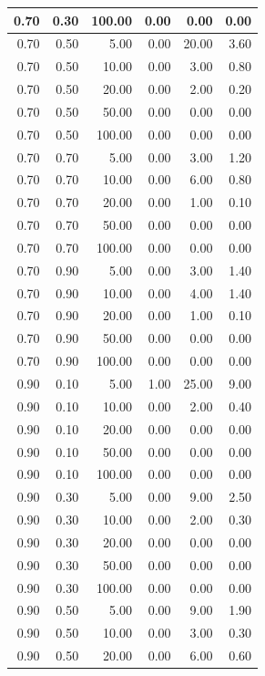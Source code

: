 \documentclass{bmstu}
\begin{document}
\begin{longtable}{|r|r|r|r|r|r|}
0.70 & 0.30 & 100.00 & 0.00 & 0.00 & 0.00 \\ \hline
0.70 & 0.50 & 5.00 & 0.00 & 20.00 & 3.60 \\ \hline
0.70 & 0.50 & 10.00 & 0.00 & 3.00 & 0.80 \\ \hline
0.70 & 0.50 & 20.00 & 0.00 & 2.00 & 0.20 \\ \hline
0.70 & 0.50 & 50.00 & 0.00 & 0.00 & 0.00 \\ \hline
0.70 & 0.50 & 100.00 & 0.00 & 0.00 & 0.00 \\ \hline
0.70 & 0.70 & 5.00 & 0.00 & 3.00 & 1.20 \\ \hline
0.70 & 0.70 & 10.00 & 0.00 & 6.00 & 0.80 \\ \hline
0.70 & 0.70 & 20.00 & 0.00 & 1.00 & 0.10 \\ \hline
0.70 & 0.70 & 50.00 & 0.00 & 0.00 & 0.00 \\ \hline
0.70 & 0.70 & 100.00 & 0.00 & 0.00 & 0.00 \\ \hline
0.70 & 0.90 & 5.00 & 0.00 & 3.00 & 1.40 \\ \hline
0.70 & 0.90 & 10.00 & 0.00 & 4.00 & 1.40 \\ \hline
0.70 & 0.90 & 20.00 & 0.00 & 1.00 & 0.10 \\ \hline
0.70 & 0.90 & 50.00 & 0.00 & 0.00 & 0.00 \\ \hline
0.70 & 0.90 & 100.00 & 0.00 & 0.00 & 0.00 \\ \hline
0.90 & 0.10 & 5.00 & 1.00 & 25.00 & 9.00 \\ \hline
0.90 & 0.10 & 10.00 & 0.00 & 2.00 & 0.40 \\ \hline
0.90 & 0.10 & 20.00 & 0.00 & 0.00 & 0.00 \\ \hline
0.90 & 0.10 & 50.00 & 0.00 & 0.00 & 0.00 \\ \hline
0.90 & 0.10 & 100.00 & 0.00 & 0.00 & 0.00 \\ \hline
0.90 & 0.30 & 5.00 & 0.00 & 9.00 & 2.50 \\ \hline
0.90 & 0.30 & 10.00 & 0.00 & 2.00 & 0.30 \\ \hline
0.90 & 0.30 & 20.00 & 0.00 & 0.00 & 0.00 \\ \hline
0.90 & 0.30 & 50.00 & 0.00 & 0.00 & 0.00 \\ \hline
0.90 & 0.30 & 100.00 & 0.00 & 0.00 & 0.00 \\ \hline
0.90 & 0.50 & 5.00 & 0.00 & 9.00 & 1.90 \\ \hline
0.90 & 0.50 & 10.00 & 0.00 & 3.00 & 0.30 \\ \hline
0.90 & 0.50 & 20.00 & 0.00 & 6.00 & 0.60 \\ \hline

\end{longtable}
\end{document}
